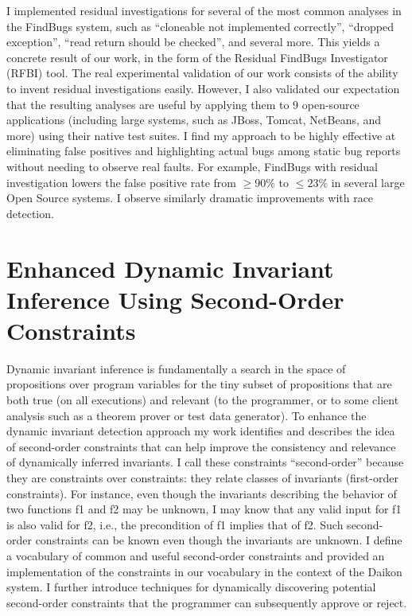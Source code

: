 \documentclass[proposal]{umthesis} %
\begin{document}
I implemented residual investigations for several of the most common analyses in the FindBugs system, such as “cloneable not implemented correctly”, “dropped exception”, “read return should be checked”, and several more. This yields a concrete result of our work, in the form of the Residual FindBugs Investigator (RFBI) tool.  The real experimental validation of our work consists of the ability to invent residual investigations easily. However, I also validated our expectation that the resulting analyses are useful by applying them to 9 open-source applications (including large systems, such as JBoss, Tomcat, NetBeans, and more) using their native test suites. 
I find my approach to be highly effective at eliminating
false positives and highlighting actual bugs among static bug reports without needing to
observe real faults. For example, FindBugs with residual investigation lowers the false
positive rate from $\geq 90\%$ to $\leq 23\%$ in several large Open Source systems. I observe similarly dramatic improvements with race detection.

\section{Enhanced Dynamic Invariant Inference Using Second-Order Constraints}
Dynamic invariant inference is fundamentally a search in the space of propositions over program variables for the tiny subset of propositions that are both true (on all executions) and relevant (to the programmer, or to some client analysis such as a theorem prover or test data generator). To enhance the dynamic invariant detection approach my work\cite{Li:2013:SCD:2491411.2491457} identifies and describes the idea of second-order constraints that can help improve the consistency and relevance of dynamically inferred invariants.  I call these constraints “second-order” because they are constraints over constraints: they relate classes of invariants (first-order constraints). For instance, even though the invariants describing the behavior of two functions f1 and f2 may be unknown, I may know that any valid input for f1 is also valid for f2, i.e., the precondition of f1 implies that of f2.  Such second-order constraints can be known even though the invariants are unknown.  I define a vocabulary of common and useful second-order constraints and provided an implementation of the constraints in our vocabulary in the context of the Daikon system.  I further introduce techniques for dynamically discovering potential second-order constraints that the programmer can subsequently approve or reject.
\end{document}
